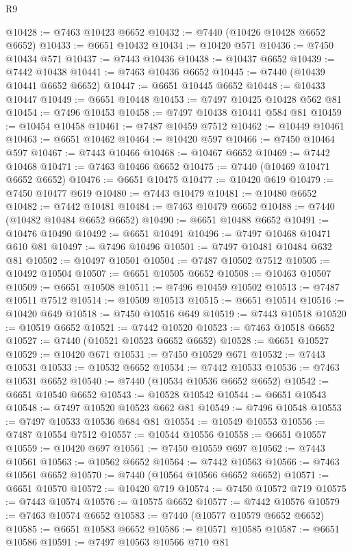 \begin{lexlean}{R9}
\begin{coremodule}
{{{{{{{{{{{{{{{{{{{{{{{{{{{{{{{{{{{{{{{{{{{{{{{{{{{{{{{{{{{{{{{{{{{{{{{{{{{{{{{{{{{{@10428 := @7463 @10423 @6652
@10432 := @7440 (@10426 @10428 @6652 @6652)
@10433 := @6651 @10432
@10434 := @10420 @571
@10436 := @7450 @10434 @571
@10437 := @7443 @10436
@10438 := @10437 @6652
@10439 := @7442 @10438
@10441 := @7463 @10436 @6652
@10445 := @7440 (@10439 @10441 @6652 @6652)
@10447 := @6651 @10445 @6652
@10448 := @10433 @10447
@10449 := @6651 @10448
@10453 := @7497 @10425 @10428 @562 @81
@10454 := @7496 @10453
@10458 := @7497 @10438 @10441 @584 @81
@10459 := @10454 @10458
@10461 := @7487 @10459 @7512
@10462 := @10449 @10461
@10463 := @6651 @10462
@10464 := @10420 @597
@10466 := @7450 @10464 @597
@10467 := @7443 @10466
@10468 := @10467 @6652
@10469 := @7442 @10468
@10471 := @7463 @10466 @6652
@10475 := @7440 (@10469 @10471 @6652 @6652)
@10476 := @6651 @10475
@10477 := @10420 @619
@10479 := @7450 @10477 @619
@10480 := @7443 @10479
@10481 := @10480 @6652
@10482 := @7442 @10481
@10484 := @7463 @10479 @6652
@10488 := @7440 (@10482 @10484 @6652 @6652)
@10490 := @6651 @10488 @6652
@10491 := @10476 @10490
@10492 := @6651 @10491
@10496 := @7497 @10468 @10471 @610 @81
@10497 := @7496 @10496
@10501 := @7497 @10481 @10484 @632 @81
@10502 := @10497 @10501
@10504 := @7487 @10502 @7512
@10505 := @10492 @10504
@10507 := @6651 @10505 @6652
@10508 := @10463 @10507
@10509 := @6651 @10508
@10511 := @7496 @10459 @10502
@10513 := @7487 @10511 @7512
@10514 := @10509 @10513
@10515 := @6651 @10514
@10516 := @10420 @649
@10518 := @7450 @10516 @649
@10519 := @7443 @10518
@10520 := @10519 @6652
@10521 := @7442 @10520
@10523 := @7463 @10518 @6652
@10527 := @7440 (@10521 @10523 @6652 @6652)
@10528 := @6651 @10527
@10529 := @10420 @671
@10531 := @7450 @10529 @671
@10532 := @7443 @10531
@10533 := @10532 @6652
@10534 := @7442 @10533
@10536 := @7463 @10531 @6652
@10540 := @7440 (@10534 @10536 @6652 @6652)
@10542 := @6651 @10540 @6652
@10543 := @10528 @10542
@10544 := @6651 @10543
@10548 := @7497 @10520 @10523 @662 @81
@10549 := @7496 @10548
@10553 := @7497 @10533 @10536 @684 @81
@10554 := @10549 @10553
@10556 := @7487 @10554 @7512
@10557 := @10544 @10556
@10558 := @6651 @10557
@10559 := @10420 @697
@10561 := @7450 @10559 @697
@10562 := @7443 @10561
@10563 := @10562 @6652
@10564 := @7442 @10563
@10566 := @7463 @10561 @6652
@10570 := @7440 (@10564 @10566 @6652 @6652)
@10571 := @6651 @10570
@10572 := @10420 @719
@10574 := @7450 @10572 @719
@10575 := @7443 @10574
@10576 := @10575 @6652
@10577 := @7442 @10576
@10579 := @7463 @10574 @6652
@10583 := @7440 (@10577 @10579 @6652 @6652)
@10585 := @6651 @10583 @6652
@10586 := @10571 @10585
@10587 := @6651 @10586
@10591 := @7497 @10563 @10566 @710 @81
}}}}}}}}}}}}}}}}}}}}}}}}}}}}}}}}}}}}}}}}}}}}}}}}}}}}}}}}}}}}}}}}}}}}}}}}}}}}}}}}}}}}
\end{coremodule}
\end{lexlean}
